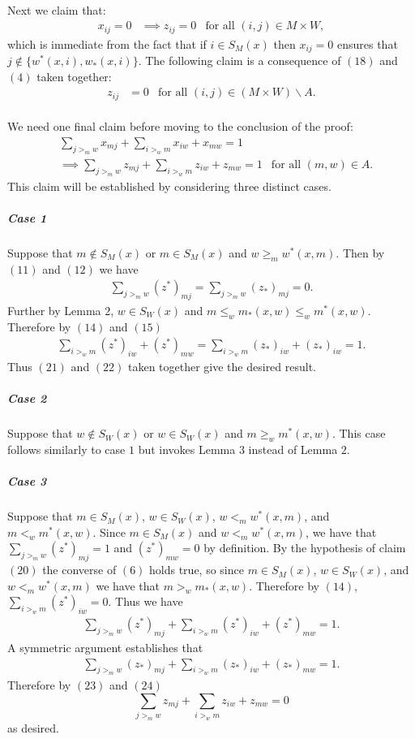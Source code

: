\documentclass[letterpaper,12pt,oneside,onecolumn]{article}
\begin{document}
\paragraph{}
Next we claim that:
\begin{align}
x_{ij} = 0 &\implies z_{ij} = 0 &\text{for all $(i,j) \in M \times W$},
\end{align}
which is immediate from the fact that if $i \in S_M(x)$ then $x_{ij} = 0$ ensures that $j \not\in \{w^*(x,i), w_*(x,i)\}$. The following claim is a consequence of $(18)$ and $(4)$ taken together:
\begin{align}
z_{ij} &= 0 &\text{for all $(i,j) \in (M \times W) \backslash A$}.
\end{align}
\paragraph{}
We need one final claim before moving to the conclusion of the proof:
\begin{align}
&\sum_{j >_m w} x_{mj} + \sum_{i >_w m} x_{iw} + x_{mw} = 1 \nonumber\\&\implies \sum_{j >_m w} z_{mj} + \sum_{i >_w m} z_{iw} + z_{mw} = 1 &\text{for all $(m,w) \in A$}.
\end{align}
This claim will be established by considering three distinct cases.
\subparagraph{Case 1}
Suppose that $m \not\in S_M(x)$ or $m \in S_M(x)$ and $w \geq_m w^*(x,m)$. Then by $(11)$ and $(12)$ we have
\begin{align}
\sum_{j >_m w} (z^*)_{mj} = \sum_{j >_m w} (z_*)_{mj} = 0.
\end{align}
Further by Lemma $2$, $w \in S_W(x)$ and $m \leq_w m_*(x,w) \leq_w m^*(x,w)$. Therefore by $(14)$ and $(15)$
\begin{align}
\sum_{i >_w m} (z^*)_{iw} + (z^*)_{mw} = \sum_{i >_w m} (z_*)_{iw} + (z_*)_{iw} = 1.
\end{align}
Thus $(21)$ and $(22)$ taken together give the desired result.
\subparagraph{Case 2}
Suppose that $w \not\in S_W(x)$ or $w \in S_W(x)$ and $m \geq_w m^*(x,w)$. This case follows similarly to case $1$ but invokes Lemma $3$ instead of Lemma $2$.
\subparagraph{Case 3}
Suppose that $m \in S_M(x)$, $w \in S_W(x)$, $w <_m w^*(x,m)$, and $m <_w m^*(x,w)$. Since $m \in S_M(x)$ and $w <_m w^*(x,m)$, we have that $\sum_{j >_m w} (z^*)_{mj} = 1$ and $(z^*)_{mw} = 0$ by definition. By the hypothesis of claim $(20)$ the converse of $(6)$ holds true, so since $m \in S_M(x)$, $w \in S_W(x)$, and $w <_m w^*(x,m)$ we have that $m >_w m_*(x,w)$. Therefore by $(14)$, $\sum_{i >_w m} (z^*)_{iw} = 0$. Thus we have
\begin{align}
\sum_{j >_m w} (z^*)_{mj} + \sum_{i >_w m} (z^*)_{iw} + (z^*)_{mw}  = 1.
\end{align}
A symmetric argument establishes that
\begin{align}
\sum_{j >_m w} (z_*)_{mj} + \sum_{i >_w m} (z_*)_{iw} + (z_*)_{mw}  = 1.
\end{align}
Therefore by $(23)$ and $(24)$
$$\sum_{j >_m w} z_{mj} + \sum_{i >_w m} z_{iw} + z_{mw}  = 0$$
as desired.
\end{document}
